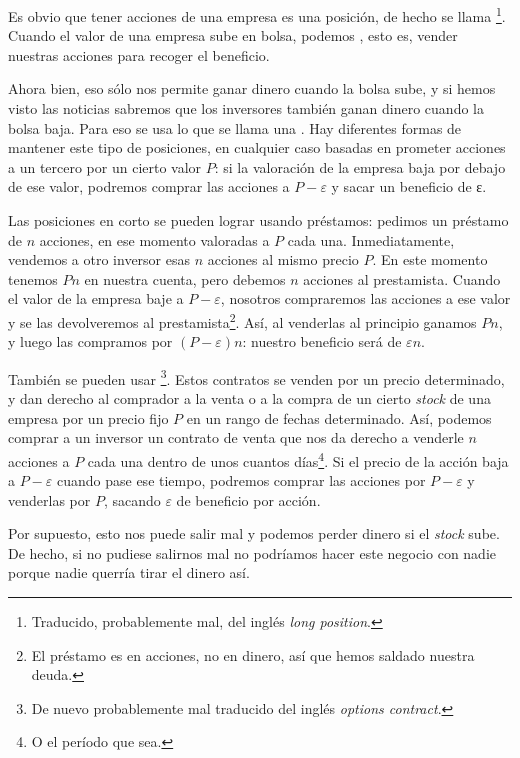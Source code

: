 \documentclass[nochap,palatino,shortheader]{apuntes}
\begin{document}
Es obvio que tener acciones de una empresa es una posición, de hecho se llama \footnote{Traducido, probablemente mal, del inglés \textit{long position}.}. Cuando el valor de una empresa sube en bolsa, podemos , esto es, vender nuestras acciones para recoger el beneficio.

Ahora bien, eso sólo nos permite ganar dinero cuando la bolsa sube, y si hemos visto las noticias sabremos que los inversores también ganan dinero cuando la bolsa baja. Para eso se usa lo que se llama una . Hay diferentes formas de mantener este tipo de posiciones, en cualquier caso basadas en prometer acciones a un tercero por un cierto valor $P$: si la valoración de la empresa baja por debajo de ese valor, podremos comprar las  acciones a $P - ε$ y sacar un beneficio de ε.

Las posiciones en corto se pueden lograr usando préstamos: pedimos un préstamo de $n$ acciones, en ese momento valoradas a $P$ cada una. Inmediatamente, vendemos a otro inversor esas $n$ acciones al mismo precio $P$. En este momento tenemos $Pn$ en nuestra cuenta, pero debemos $n$ acciones al prestamista. Cuando el valor de la empresa baje a $P-ε$, nosotros compraremos las acciones a ese valor y se las devolveremos al prestamista\footnote{El préstamo es en acciones, no en dinero, así que hemos saldado nuestra deuda.}. Así, al venderlas al principio ganamos $Pn$, y luego las compramos por $(P-ε)n$: nuestro beneficio será de $εn$.

También se pueden usar \footnote{De nuevo probablemente mal traducido del inglés \textit{options contract}.}. Estos contratos se venden por un precio determinado, y dan derecho al comprador a la venta o a la compra de un cierto \textit{stock} de una empresa por un precio fijo $P$ en un rango de fechas determinado. Así, podemos comprar a un inversor un contrato de venta que nos da derecho a venderle $n$ acciones a $P$ cada una dentro de unos cuantos días\footnote{O el período que sea.}. Si el precio de la acción baja a $P - ε$ cuando pase ese tiempo, podremos comprar las acciones por $P - ε$ y venderlas por $P$, sacando $ε$ de beneficio por acción.

Por supuesto, esto nos puede salir mal y podemos perder dinero si el \textit{stock} sube. De hecho, si no pudiese salirnos mal no podríamos hacer este negocio con nadie porque nadie querría tirar el dinero así.
\end{document}
